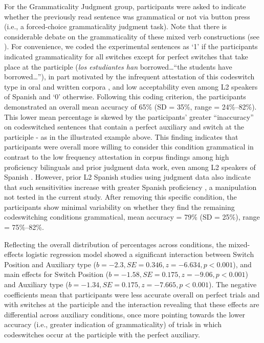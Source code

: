 \documentclass[output=paper,colorlinks,citecolor=brown]{langscibook}
\begin{document}
For the Grammaticality Judgment group, participants were asked to indicate whether the previously read sentence was grammatical or not via button press (i.e., a forced-choice grammaticality judgment task). Note that there is considerable debate on the grammaticality of these mixed verb constructions (see \cite{Balametal2020,Giancaspro2015,GuzzardoTamargoetal2016}). For convenience, we coded the experimental sentences as `1' if the participants indicated grammaticality for all switches except for perfect switches that take place at the participle (\textit{los estudiantes han} borrowed\ldots ``the students have borrowed\ldots''), in part motivated by the infrequent attestation of this codeswitch type in oral and written corpora \citep{GuzzardoTamargoetal2016}, and low acceptability even among L2 speakers of Spanish \citep{Giancaspro2015} and `0' otherwise. Following this coding criterion, the participants demonstrated an overall mean accuracy of 65\% (SD = 35\%, range = 24\%--82\%). This lower mean percentage is skewed by the participants’ greater ``inaccuracy'' on codeswitched sentences that contain a perfect auxiliary and switch at the participle - as in the illustrated example above. This finding indicates that participants were overall more willing to consider this condition grammatical in contrast to the low frequency attestation in corpus findings among high proficiency bilinguals and prior judgment data work, even among L2 speakers of Spanish \citep{Giancaspro2015}. However, prior L2 Spanish studies using judgment data also indicate that such sensitivities increase with greater Spanish proficiency \citep{Giancaspro2015,Koronkiewicz2018}, a manipulation not tested in the current study. After removing this specific condition, the participants show minimal variability on whether they find the remaining codeswitching conditions grammatical, mean accuracy = 79\% (SD = 25\%), range = 75\%--82\%.

Reflecting the overall distribution of percentages across conditions, the mixed-effects logistic regression model showed a significant interaction between Switch Position and Auxiliary type ($b = -2.3, SE = 0.346, z = -6.634, p < 0.001$), and main effects for Switch Position ($b = -1.58, SE = 0.175, z = -9.06, p < 0.001$) and Auxiliary type ($b = -1.34, SE = 0.175, z = -7.665, p < 0.001$). The negative coefficients mean that participants were less accurate overall on perfect trials and with switches at the participle and the interaction revealing that these effects are differential across auxiliary conditions, once more pointing towards the lower accuracy (i.e., greater indication of grammaticality) of trials in which codeswitches occur at the participle with the perfect auxiliary.
\end{document}

